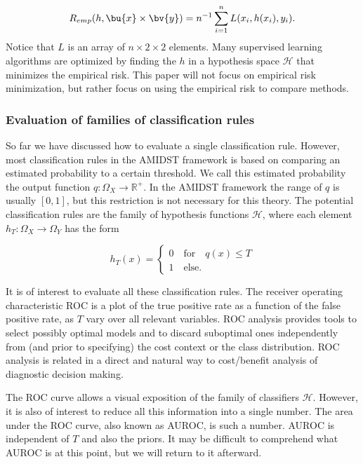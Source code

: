 \begin{equation}
\label{def:empRisk}
R_{emp}(h, \bu{x} \times \bv{y}) = n^{-1} \sum_{i=1}^n L(x_i, h(x_i), y_i).
\end{equation}
Notice that $L$ is an array of $n \times 2\times 2$ elements.  Many supervised learning algorithms are optimized by finding the $h$ in a hypothesis space $\mathcal{H}$ that minimizes the empirical risk.  This paper will not focus on empirical risk minimization, but rather focus on using the empirical risk to compare methods.


\subsubsection{Evaluation of families of classification rules}
\label{sec:hypothesisSpace}

So far we have discussed how to evaluate a single classification rule.  However, most classification rules in the AMIDST framework is based on comparing an estimated probability to a certain threshold.  We call this estimated probability the output function $q: \Omega_X \rightarrow \mathbb{R}^+$.  In the AMIDST framework the range of $q$ is usually $[0, 1]$, but this restriction is not necessary for this theory.  The potential classification rules are the family of hypothesis functions $\mathcal{H}$, where each element $h_T:\Omega_X \rightarrow \Omega_Y$ has the form 

\begin{equation}
\label{eq:ht}
h_T(x) = 
\begin{cases}
0 \quad \mbox{for} \quad q(x) \leq T\\
1 \quad \mbox{else}.
\end{cases}
\end{equation}

It is of interest to evaluate all these classification rules.  The receiver operating characteristic ROC is a plot of the true positive rate as a function of the false positive rate, as $T$ vary over all relevant variables.  ROC analysis provides tools to select possibly optimal models and to discard suboptimal ones independently from (and prior to specifying) the cost context or the class distribution. ROC analysis is related in a direct and natural way to cost/benefit analysis of diagnostic decision making.


The ROC curve allows a visual exposition of the family of classifiers $\mathcal{H}$.  However, it is also of interest to reduce all this information into a single number.  The area under the ROC curve, also known as AUROC, is such a number.  
AUROC is independent of $T$ and also the priors.  It may be difficult to comprehend what AUROC is at this point, but we will return to it afterward.

